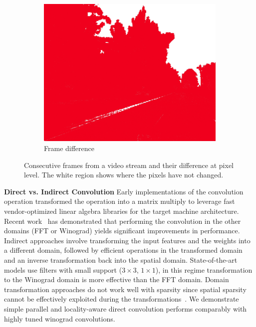 \documentclass{article}
\begin{document}
\begin{figure}[h]
\begin{subfigure}{0.3\textwidth}
	\includegraphics[width=\textwidth]{diff.jpg}
	\caption{Frame difference}
\end{subfigure}
\caption{Consecutive frames from a video stream and their difference at pixel
    level. The white region shows where the pixels have not changed.}
\label{fig:frames}
\end{figure}

\textbf{Direct vs. Indirect Convolution} Early implementations of the convolution
operation transformed the operation into a matrix multiply to leverage fast
vendor-optimized linear algebra libraries for the target machine architecture.
Recent work~\cite{vasilache2014fast, lavin2016fast} has demonstrated that
performing the convolution in the other domains (FFT or Winograd) yields
significant improvements in performance.  Indirect approaches involve
transforming the input features and the weights into a different domain,
followed by efficient operations in the transformed domain and an inverse
transformation back into the spatial domain. State-of-the-art models use filters
with small support ($3 \times 3$, $1 \times 1$), in this regime transformation
to the Winograd domain is more effective than the FFT domain. Domain
transformation approaches do not work well with sparsity since spatial sparsity
cannot be effectively exploited during the
transformations~\cite{liu2018efficient}.  We demonstrate simple parallel and
locality-aware direct convolution performs comparably with highly tuned winograd
convolutions.
\end{document}
